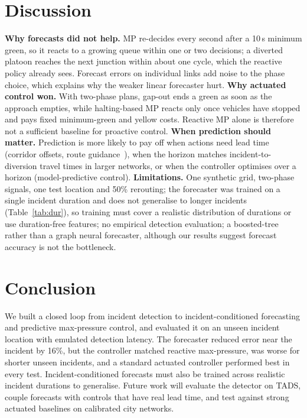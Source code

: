 \documentclass[conference]{IEEEtran}
\begin{document}
\section{Discussion}
\textbf{Why forecasts did not help.} MP re-decides every second after a 10\,s minimum green, so it reacts to a growing queue within one or two decisions; a diverted platoon reaches the next junction within about one cycle, which the reactive policy already sees. Forecast errors on individual links add noise to the phase choice, which explains why the weaker linear forecaster hurt.
\textbf{Why actuated control won.} With two-phase plans, gap-out ends a green as soon as the approach empties, while halting-based MP reacts only once vehicles have stopped and pays fixed minimum-green and yellow costs. Reactive MP alone is therefore not a sufficient baseline for proactive control.
\textbf{When prediction should matter.} Prediction is more likely to pay off when actions need lead time (corridor offsets, route guidance~\cite{proactive2023divergent}), when the horizon matches incident-to-diversion travel times in larger networks, or when the controller optimises over a horizon (model-predictive control).
\textbf{Limitations.} One synthetic grid, two-phase signals, one test location and 50\% rerouting; the forecaster was trained on a single incident duration and does not generalise to longer incidents (Table~\ref{tab:dur}), so training must cover a realistic distribution of durations or use duration-free features; no empirical detection evaluation; a boosted-tree rather than a graph neural forecaster, although our results suggest forecast accuracy is not the bottleneck.

\section{Conclusion}
We built a closed loop from incident detection to incident-conditioned forecasting and predictive max-pressure control, and evaluated it on an unseen incident location with emulated detection latency. The forecaster reduced error near the incident by 16\%, but the controller matched reactive max-pressure, was worse for shorter unseen incidents, and a standard actuated controller performed best in every test. Incident-conditioned forecasts must also be trained across realistic incident durations to generalise. Future work will evaluate the detector on TADS, couple forecasts with controls that have real lead time, and test against strong actuated baselines on calibrated city networks.



\end{document}
